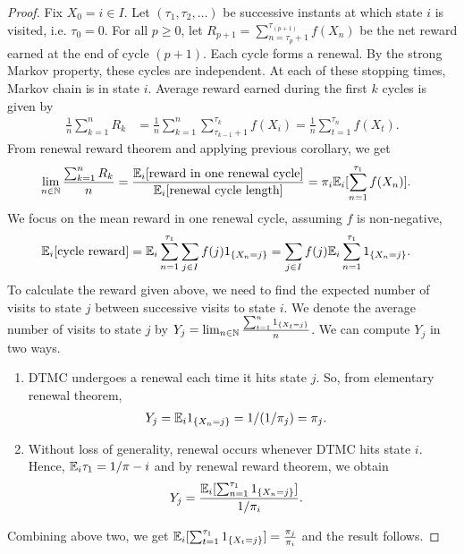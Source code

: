 \documentclass[a4paper,10pt,english]{article}
\begin{document}
\begin{proof}

Fix $X_0 = i \in I$. Let $(\tau_1, \tau_2, \ldots)$ be successive instants at which state $i$ is visited, i.e. $\tau_0 = 0$. 
For all $p \geq 0$,  let $R_{p+1} = \sum_{n = \tau_p + 1}^{\tau_{(p + 1)}} f(X_n)$ be the net reward earned at the end of cycle $(p+1)$. 
Each cycle forms a renewal. 
By the strong Markov property, these cycles are independent. 
At each of these stopping times, Markov chain is in state $i$. 
Average reward earned during the first $k$ cycles is given by
\begin{align*}	
\frac{1}{n} \sum_{k=1}^{n} R_k &= \frac{1}{n} \sum_{k=1}^{n} \sum_{\tau_{k-1} + 1}^{\tau_k} f(X_i)= \frac{1}{n} \sum_{t=1}^{\tau_n} f(X_t).
\end{align*}
From renewal reward theorem and applying previous corollary, we get
\begin{align*}
\lim_{n \in \mathbb{N}}\frac{\sum_{k=1}^nR_k}{n} &= \frac{\mathbb{E}_i[\text{reward in one renewal cycle}]}{\mathbb{E}_i[\text{renewal cycle length}]} = \pi_i\mathbb{E}_i[\sum_{n=1}^{\tau_1}f(X_n)].
\end{align*}
We focus on the mean reward in one renewal cycle, assuming $f$ is non-negative,
\begin{align*}
\mathbb{E}_i[\text{cycle reward}] &= \mathbb{E}_i\sum_{n=1}^{\tau_1} \sum_{j \in I} f(j) 1_{\{X_n = j\}} = \sum_{j \in I} f(j) \mathbb{E}_i\sum_{n=1}^{\tau_1} 1_{\{X_n = j\}}.
\end{align*}
To calculate the reward given above, we need to find the expected number of visits to state $j$ between successive visits to state $i$. 
We denote the average number of visits to state $j$ by  
$Y_j = \lim_{n \in \mathbb{N}}\frac{\sum_{t=1}^{n} 1_{\{X_t = j\}}}{n}$. %
We can compute $Y_j$ in two ways.
\begin{enumerate}
	\item DTMC undergoes a renewal each time it hits state $j$. 
	So, from elementary renewal theorem, 
	\begin{align*}
	Y_j &= \mathbb{E}_i1_{\{X_n = j\}} = 1/(1/\pi_j) = \pi_j.
	\end{align*}
	\item Without loss of generality, renewal occurs whenever DTMC hits state $i$. Hence, $\mathbb{E}_i\tau_1 = 1/\pi-i$ and by renewal reward theorem, we obtain
	\begin{align*}
	Y_j &= \frac{\mathbb{E}_i[\sum_{n=1}^{\tau_1} 1_{\{X_n = j\}}]}{1/\pi_i}.
	\end{align*}
\end{enumerate}
Combining above two, we get $\mathbb{E}_i[\sum_{t=1}^{\tau_1} 1_{\{X_t = j\}}] = \frac{\pi_j}{\pi_i}$ and the result follows. 
\end{proof}
\end{document}
